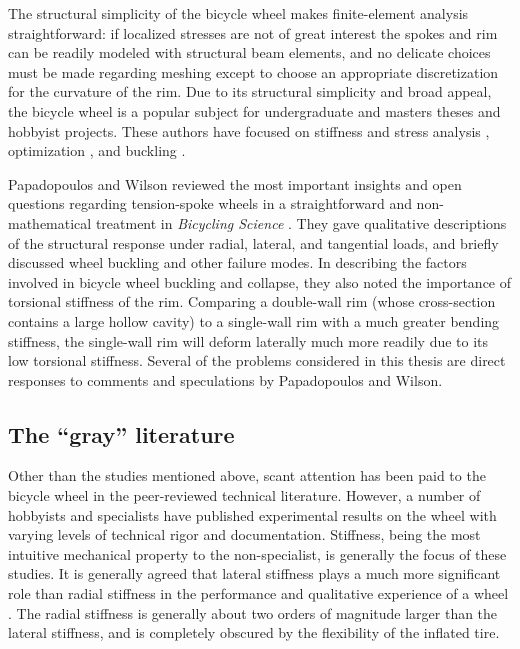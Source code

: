 \documentclass[../thesis.tex]{subfiles}
\begin{document}
The structural simplicity of the bicycle wheel makes finite-element analysis straightforward: if localized stresses are not of great interest the spokes and rim can be readily modeled with structural beam elements, and no delicate choices must be made regarding meshing except to choose an appropriate discretization for the curvature of the rim. Due to its structural simplicity and broad appeal, the bicycle wheel is a popular subject for undergraduate and masters theses and hobbyist projects. These authors have focused on stiffness and stress analysis \cite{Hartz2002,Ng2012}, optimization \cite{Keller2013,Svensson2015}, and buckling \cite{Kern2016}.

Papadopoulos and Wilson reviewed the most important insights and open questions regarding tension-spoke wheels in a straightforward and non-mathematical treatment in \emph{Bicycling Science} \cite{Wilson2004}. They gave qualitative descriptions of the structural response under radial, lateral, and tangential loads, and briefly discussed wheel buckling and other failure modes. In describing the factors involved in bicycle wheel buckling and collapse, they also noted the importance of torsional stiffness of the rim. Comparing a double-wall rim (whose cross-section contains a large hollow cavity) to a single-wall rim with a much greater bending stiffness, the single-wall rim will deform laterally much more readily due to its low torsional stiffness. Several of the problems considered in this thesis are direct responses to comments and speculations by Papadopoulos and Wilson.

\subsection{The ``gray'' literature}

Other than the studies mentioned above, scant attention has been paid to the bicycle wheel in the peer-reviewed technical literature. However, a number of hobbyists and specialists have published experimental results on the wheel with varying levels of technical rigor and documentation. Stiffness, being the most intuitive mechanical property to the non-specialist, is generally the focus of these studies. It is generally agreed that lateral stiffness plays a much more significant role than radial stiffness in the performance and qualitative experience of a wheel \cite{Kopecky2013}. The radial stiffness is generally about two orders of magnitude larger than the lateral stiffness, and is completely obscured by the flexibility of the inflated tire.
\end{document}
